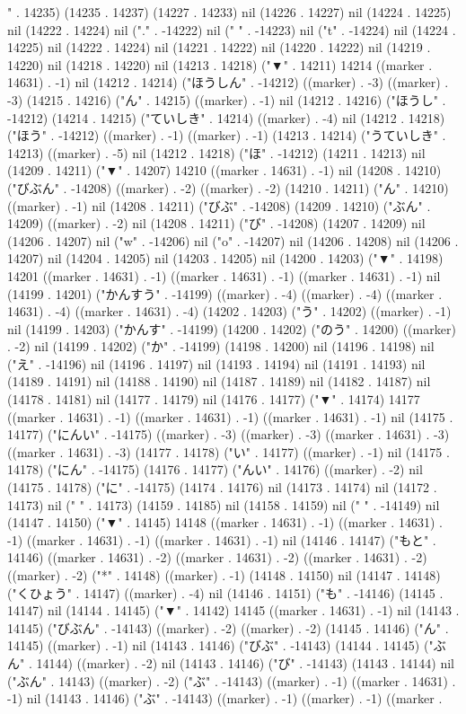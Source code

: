 " . 14235) (14235 . 14237) (14227 . 14233) nil (14226 . 14227) nil (14224 . 14225) nil (14222 . 14224) nil ("." . -14222) nil (" " . -14223) nil ("t" . -14224) nil (14224 . 14225) nil (14222 . 14224) nil (14221 . 14222) nil (14220 . 14222) nil (14219 . 14220) nil (14218 . 14220) nil (14213 . 14218) ("▼" . 14211) 14214 ((marker . 14631) . -1) nil (14212 . 14214) ("ほうしん" . -14212) ((marker) . -3) ((marker) . -3) (14215 . 14216) ("ん" . 14215) ((marker) . -1) nil (14212 . 14216) ("ほうし" . -14212) (14214 . 14215) ("ていしき" . 14214) ((marker) . -4) nil (14212 . 14218) ("ほう" . -14212) ((marker) . -1) ((marker) . -1) (14213 . 14214) ("うていしき" . 14213) ((marker) . -5) nil (14212 . 14218) ("ほ" . -14212) (14211 . 14213) nil (14209 . 14211) ("▼" . 14207) 14210 ((marker . 14631) . -1) nil (14208 . 14210) ("びぶん" . -14208) ((marker) . -2) ((marker) . -2) (14210 . 14211) ("ん" . 14210) ((marker) . -1) nil (14208 . 14211) ("びぶ" . -14208) (14209 . 14210) ("ぶん" . 14209) ((marker) . -2) nil (14208 . 14211) ("び" . -14208) (14207 . 14209) nil (14206 . 14207) nil ("w" . -14206) nil ("o" . -14207) nil (14206 . 14208) nil (14206 . 14207) nil (14204 . 14205) nil (14203 . 14205) nil (14200 . 14203) ("▼" . 14198) 14201 ((marker . 14631) . -1) ((marker . 14631) . -1) ((marker . 14631) . -1) nil (14199 . 14201) ("かんすう" . -14199) ((marker) . -4) ((marker) . -4) ((marker . 14631) . -4) ((marker . 14631) . -4) (14202 . 14203) ("う" . 14202) ((marker) . -1) nil (14199 . 14203) ("かんす" . -14199) (14200 . 14202) ("のう" . 14200) ((marker) . -2) nil (14199 . 14202) ("か" . -14199) (14198 . 14200) nil (14196 . 14198) nil ("え" . -14196) nil (14196 . 14197) nil (14193 . 14194) nil (14191 . 14193) nil (14189 . 14191) nil (14188 . 14190) nil (14187 . 14189) nil (14182 . 14187) nil (14178 . 14181) nil (14177 . 14179) nil (14176 . 14177) ("▼" . 14174) 14177 ((marker . 14631) . -1) ((marker . 14631) . -1) ((marker . 14631) . -1) nil (14175 . 14177) ("にんい" . -14175) ((marker) . -3) ((marker) . -3) ((marker . 14631) . -3) ((marker . 14631) . -3) (14177 . 14178) ("い" . 14177) ((marker) . -1) nil (14175 . 14178) ("にん" . -14175) (14176 . 14177) ("んい" . 14176) ((marker) . -2) nil (14175 . 14178) ("に" . -14175) (14174 . 14176) nil (14173 . 14174) nil (14172 . 14173) nil (" " . 14173) (14159 . 14185) nil (14158 . 14159) nil (" " . -14149) nil (14147 . 14150) ("▼" . 14145) 14148 ((marker . 14631) . -1) ((marker . 14631) . -1) ((marker . 14631) . -1) ((marker . 14631) . -1) nil (14146 . 14147) ("もと" . 14146) ((marker . 14631) . -2) ((marker . 14631) . -2) ((marker . 14631) . -2) ((marker) . -2) ("*" . 14148) ((marker) . -1) (14148 . 14150) nil (14147 . 14148) ("くひょう" . 14147) ((marker) . -4) nil (14146 . 14151) ("も" . -14146) (14145 . 14147) nil (14144 . 14145) ("▼" . 14142) 14145 ((marker . 14631) . -1) nil (14143 . 14145) ("びぶん" . -14143) ((marker) . -2) ((marker) . -2) (14145 . 14146) ("ん" . 14145) ((marker) . -1) nil (14143 . 14146) ("びぶ" . -14143) (14144 . 14145) ("ぶん" . 14144) ((marker) . -2) nil (14143 . 14146) ("び" . -14143) (14143 . 14144) nil ("ぶん" . 14143) ((marker) . -2) ("ぶ" . -14143) ((marker) . -1) ((marker . 14631) . -1) nil (14143 . 14146) ("ぶ" . -14143) ((marker) . -1) ((marker) . -1) ((marker . 